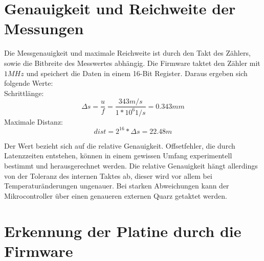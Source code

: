 \section{Genauigkeit und Reichweite der Messungen}
Die Messgenauigkeit und maximale Reichweite ist durch den Takt des Zählers, sowie die Bitbreite des Messwertes abhängig. Die Firmware taktet den Zähler mit $1MHz$ und speichert die Daten in einem 16-Bit Register. Daraus ergeben sich folgende Werte:\\
Schrittlänge:
\begin{equation} %
\Delta s = \frac{u}{f} = \frac{343m/s}{1*10^6 1/s} = 0.343 mm
\end{equation}
Maximale Distanz:
\begin{equation}
dist = 2^{16} * \Delta s = 22.48 m
\end{equation}

Der Wert bezieht sich auf die relative Genauigkeit. Offsetfehler, die durch Latenzzeiten entstehen, können in einem gewissen Umfang experimentell bestimmt und herausgerechnet werden. Die relative Genauigkeit hängt allerdings von der Toleranz des internen Taktes ab, dieser wird vor allem bei Temperaturänderungen ungenauer. Bei starken Abweichungen kann der Mikrocontroller über einen genaueren externen Quarz getaktet werden.

\section{Erkennung der Platine durch die Firmware}

